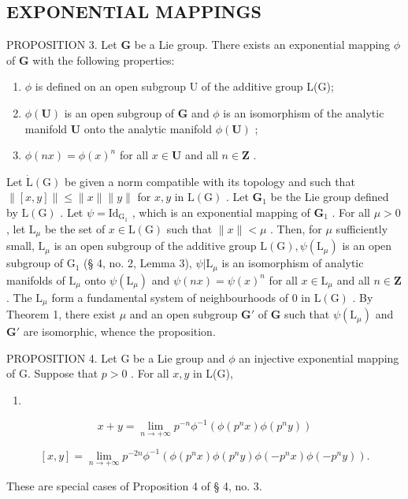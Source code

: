 \subsection{EXPONENTIAL MAPPINGS}

PROPOSITION 3. Let \(\mathbf{G}\) be a Lie group. There exists an exponential mapping \(\phi\) of \(\mathbf{G}\) with the following properties:

\begin{enumerate}
\def\labelenumi{(\roman{enumi})}
\item
  \(\phi\) is defined on an open subgroup U of the additive group L(G);
\item
  \(\phi (\mathbf{U})\) is an open subgroup of \(\mathbf{G}\) and \(\phi\) is an isomorphism of the analytic manifold \(\mathbf{U}\) onto the analytic manifold \(\phi (\mathbf{U})\) ;
\item
  \(\phi(nx) = \phi(x)^n\) for all \(x \in \mathbf{U}\) and all \(n \in \mathbf{Z}\) .
\end{enumerate}

Let \(\dot{\mathrm{L}}(\mathrm{G})\) be given a norm compatible with its topology and such that \(\| [x,y]\| \leqslant \| x\| \| y\|\) for \(x,y\) in \(\mathrm{L}(\mathrm{G})\) . Let \(\mathbf{G}_1\) be the Lie group defined by \(\mathrm{L}(\mathrm{G})\) . Let \(\psi = \mathrm{Id}_{\mathrm{G}_1}\) , which is an exponential mapping of \(\mathbf{G}_1\) . For all \(\mu >0\) , let \(\mathrm{L}_{\mu}\) be the set of \(x\in \mathrm{L}(\mathrm{G})\) such that \(\| x\| < \mu\) . Then, for \(\mu\) sufficiently small, \(\mathrm{L}_{\mu}\) is an open subgroup of the additive group \(\mathrm{L}(\mathrm{G}),\psi (\mathrm{L}_{\mu})\) is an open subgroup of \(\mathrm{G}_1\) (§ 4, no. 2, Lemma 3), \(\psi |\mathrm{L}_{\mu}\) is an isomorphism of analytic manifolds of \(\mathrm{L}_{\mu}\) onto \(\psi (\mathrm{L}_{\mu})\) and \(\psi (nx) = \psi (x)^n\) for all \(x\in \mathrm{L}_{\mu}\) and all \(n\in \mathbf{Z}\) . The \(\mathrm{L}_{\mu}\) form a fundamental system of neighbourhoods of 0 in \(\mathrm{L}(\mathrm{G})\) . By Theorem 1, there exist \(\mu\) and an open subgroup \(\mathbf{G}'\) of \(\mathbf{G}\) such that \(\psi (\mathrm{L}_{\mu})\) and \(\mathbf{G}'\) are isomorphic, whence the proposition.

PROPOSITION 4. Let G be a Lie group and \(\phi\) an injective exponential mapping of G. Suppose that \(p > 0\) . For all \(x, y\) in L(G),

\begin{enumerate}
\def\labelenumi{(\arabic{enumi})}
\tightlist
\item
\end{enumerate}

\[
x + y = \lim _ {n \rightarrow + \infty} p ^ {- n} \phi^ {- 1} (\phi (p ^ {n} x) \phi (p ^ {n} y))\tag{1}
\]

\[
[ x, y ] = \lim _ {n \rightarrow + \infty} p ^ {- 2 n} \phi^ {- 1} (\phi (p ^ {n} x) \phi (p ^ {n} y) \phi (- p ^ {n} x) \phi (- p ^ {n} y)).\tag{2}
\]

These are special cases of Proposition 4 of § 4, no. 3.

